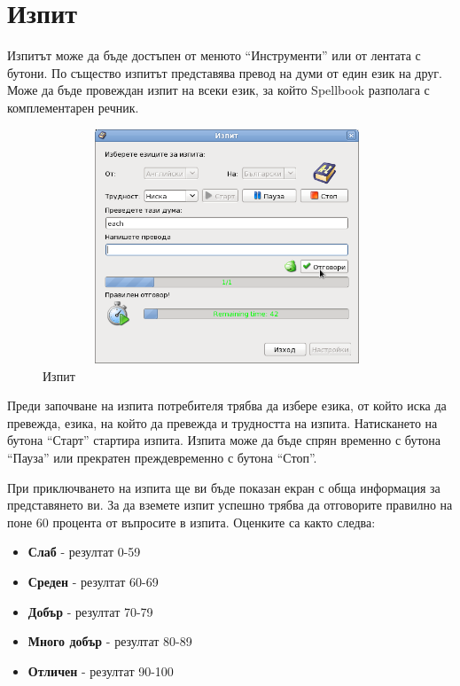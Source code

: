 \section{Изпит}
Изпитът може да бъде достъпен от менюто "`Инструменти"' или от лентата
с бутони. По същество изпитът представява превод на думи от един език
на друг. Може да бъде провеждан изпит на всеки език, за който
Spellbook разполага с комплементарен речник. 

\begin{figure}[htbp]
  \caption{Изпит}
  \centering
  \includegraphics[width=110mm, height=70mm]{images/exam_dialog.png}
\end{figure}

Преди започване на изпита потребителя трябва да избере езика, от който
иска да превежда, езика, на който да превежда и трудността на
изпита. Натискането на бутона "`Старт"' стартира изпита. Изпита може
да бъде спрян временно с бутона "`Пауза"' или прекратен преждевременно
с бутона "`Стоп"'. 

При приключването на изпита ще ви бъде показан екран с обща информация
за представянето ви. За да вземете изпит успешно трябва да отговорите
правилно на поне 60 процента от въпросите в изпита. Оценките са както
следва:
\begin{itemize}
  \item \textbf{Слаб} - резултат 0-59
  \item \textbf{Среден} - резултат 60-69
  \item \textbf{Добър} - резултат 70-79
  \item \textbf{Много добър} - резултат 80-89
  \item \textbf{Отличен} - резултат 90-100
\end{itemize}

